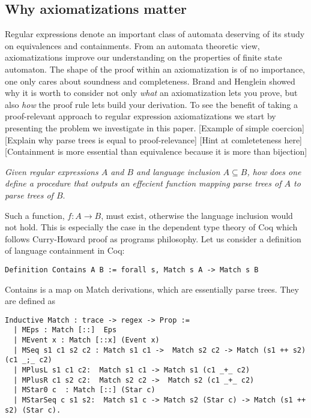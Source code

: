 \documentclass[a4paper,UKenglish,cleveref, autoref, thm-restate]{lipics-v2021}
\newcommand\mycomment[1]{}
\begin{document}
\subsection{Why axiomatizations matter}
\mycomment{Mention regular expressions as types}
Regular expressions denote an important class of automata deserving of its study on equivalences and containments. From an automata theoretic view, axiomatizations improve our understanding on the properties of finite state automaton. The shape of the proof within an axiomatization is of no importance, one only cares about soundness and completeness. Brand and Henglein showed why it is worth to consider not only \textit{what} an axiomatization lets you prove, but also \textit{how} the proof rule lets build your derivation. To see the benefit of taking a proof-relevant approach to regular expression axiomatizations we start by presenting the problem we investigate in this paper.
[Example of simple coercion]
[Explain why parse trees is equal to proof-relevance]
[Hint at comleteteness here]
[Containment is more essential than equivalence because it is more than bijection] 
\begin{center}
\textit{Given regular expressions $A$ and $B$ and language inclusion $A \subseteq  B$, how does one define a procedure that outputs an effecient function mapping parse trees of $A$ to parse trees of $B$}.\\
\end{center}
Such a function, $f : A \rightarrow B$, must exist, otherwise the language inclusion would not hold. This is especially the case in the dependent type theory of Coq which follows Curry-Howard proof as programs philosophy. Let us consider a definition of language containment in Coq:
\begin{verbatim}
Definition Contains A B := forall s, Match s A -> Match s B
\end{verbatim}
\textsf{Contains} is a map on \textsf{Match} derivations, which are essentially parse trees. 
They are defined as 
\begin{verbatim}
Inductive Match : trace -> regex -> Prop :=
  | MEps : Match [::]  Eps
  | MEvent x : Match [::x] (Event x)
  | MSeq s1 c1 s2 c2 : Match s1 c1 ->  Match s2 c2 -> Match (s1 ++ s2) (c1 _;_ c2)
  | MPlusL s1 c1 c2:  Match s1 c1 -> Match s1 (c1 _+_ c2)
  | MPlusR c1 s2 c2:  Match s2 c2 ->  Match s2 (c1 _+_ c2)
  | MStar0 c  : Match [::] (Star c)
  | MStarSeq c s1 s2:  Match s1 c -> Match s2 (Star c) -> Match (s1 ++ s2) (Star c).
\end{verbatim}
\end{document}
